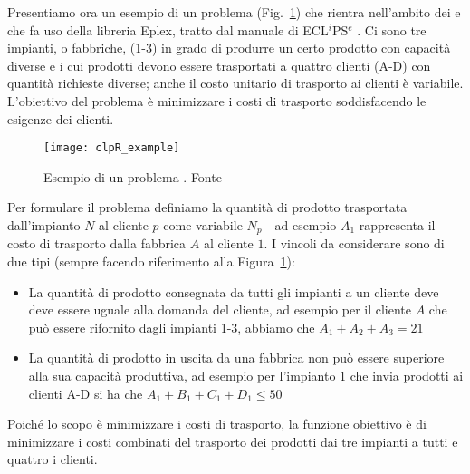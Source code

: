 
Presentiamo ora un esempio di un problema (Fig.~\ref{clpR_example}) che rientra nell'ambito dei \clpr e che fa uso della libreria Eplex, tratto dal manuale di ECL$^i$PS$^e$ \cite{eclipseTut}. Ci sono tre impianti, o fabbriche, (1-3) in grado di produrre un certo prodotto con capacità diverse e i cui prodotti devono essere trasportati a quattro clienti (A-D) con quantità richieste diverse; anche il costo unitario di trasporto ai clienti è variabile. L'obiettivo del problema è minimizzare i costi di trasporto soddisfacendo le esigenze dei clienti. 

\begin{figure}[h]
	\centering
	\texttt{[image: clpR\_example]}
	\caption{Esempio di un problema \clpr. Fonte \cite{eclipseTut}}
	\label{clpR_example}
\end{figure}

Per formulare il problema definiamo la quantità di prodotto trasportata dall'impianto $N$ al cliente $p$ come variabile $N_p$ - ad esempio $A_1$ rappresenta il costo di trasporto dalla fabbrica $A$ al cliente $1$. I vincoli da considerare sono di due tipi (sempre facendo riferimento alla Figura~\ref{clpR_example}):
\begin{itemize}
\item La quantità di prodotto consegnata da tutti gli impianti a un cliente deve deve essere uguale alla domanda del cliente, ad esempio per il cliente $A$ che può essere rifornito dagli impianti 1-3, abbiamo che $A_1+A_2+A_3=21$
\item La quantità di prodotto in uscita da una fabbrica non può essere superiore alla sua capacità produttiva, ad esempio per l'impianto $1$ che invia prodotti ai clienti A-D si ha che $A_1+B_1+C_1+D_1 \leq 50$
\end{itemize}   
Poiché lo scopo è minimizzare i costi di trasporto, la funzione obiettivo è di minimizzare i costi combinati del trasporto dei prodotti dai tre impianti a tutti e quattro i clienti.

